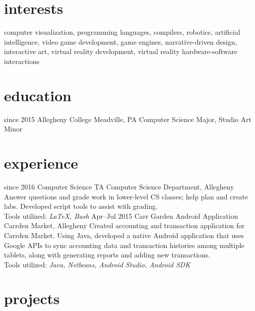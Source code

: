 \documentclass[]{friggeri-cv}
\begin{document}
\section{interests}

computer visualization, programming languages, compilers, robotics, artificial intelligence, video game development, game engines,  narrative-driven design, interactive art, virtual reality development, virtual reality hardware-software interactions

\section{education}

\begin{entrylist}
  \entry
    {\condfont since 2015}
    {Allegheny College}
    {Meadville, PA}
    {Computer Science Major, Studio Art Minor}
\end{entrylist}

\section{experience}

\begin{entrylist}
  \entry
    {since 2016}
    {Computer Science TA}
    { Computer Science Department, Allegheny}
    {Answer questions and grade work in lower-level CS classes; help plan and create labs. Developed script tools to assist with grading.\\Tools utilized: \emph{\LaTeX , Bash}}
  \entry
    {Apr--Jul 2015}
    {Carr Garden Android Application}
    { Carrden Market, Allegheny}
    {Created accounting and transaction application for Carrden Market. Using Java, developed a native Android application that uses Google APIs to sync accounting data and transaction histories among multiple tablets, along with generating reports and adding new transactions.\\Tools utilized: \emph{Java, Netbeans, Android Studio, Android SDK}}
\end{entrylist}

\section{projects}
\end{document}
